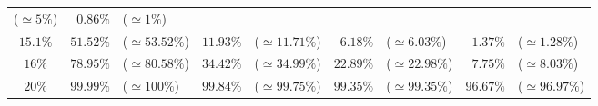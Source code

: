 \documentclass[10pt]{report}
\begin{document}
\begin{exercice}
\begin{center}
\begin{tabular}{|c|rl|rl|rl|rl|}
        ($\simeq5\%$)
         & 
    
        $0.86\%$
         & 
    
        ($\simeq1\%$)
        
    \\ 

    
        $15.1\%$
         & 
    
        $51.52\%$
         & 
    
        ($\simeq53.52\%$)
         & 
    
        $11.93\%$
         & 
    
        ($\simeq11.71\%$)
         & 
    
        $6.18\%$
         & 
    
        ($\simeq6.03\%$)
         & 
    
        $1.37\%$
         & 
    
        ($\simeq1.28\%$)
        
    \\ 

    
        $16\%$
         & 
    
        $78.95\%$
         & 
    
        ($\simeq80.58\%$)
         & 
    
        $34.42\%$
         & 
    
        ($\simeq34.99\%$)
         & 
    
        $22.89\%$
         & 
    
        ($\simeq22.98\%$)
         & 
    
        $7.75\%$
         & 
    
        ($\simeq8.03\%$)
        
    \\ 

    
        $20\%$
         & 
    
        $99.99\%$
         & 
    
        ($\simeq100\%$)
         & 
    
        $99.84\%$
         & 
    
        ($\simeq99.75\%$)
         & 
    
        $99.35\%$
         & 
    
        ($\simeq99.35\%$)
         & 
    
        $96.67\%$
         & 
    
        ($\simeq96.97\%$)
        
    \\ \cline{1-9}


\end{tabular}
\end{center}
\end{exercice}
\end{document}

